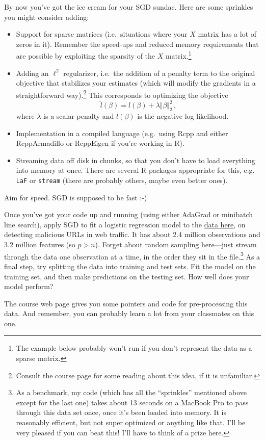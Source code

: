 \documentclass{mynotes}
\begin{document}
By now you've got the ice cream for your SGD sundae.  Here are some sprinkles you might consider adding:
\begin{itemize}
\item Support for sparse matrices (i.e.~situations where your $X$ matrix has a lot of zeros in it).  Remember the speed-ups and reduced memory requirements that are possible by exploiting the sparsity of the $X$ matrix.\footnote{The example below probably won't run if you don't represent the data as a sparse matrix. }
\item Adding an $\ell^2$ regularizer, i.e.~the addition of a penalty term to the original objective that stabilizes your estimates (which will modify the gradients in a straightforward way).\footnote{Consult the course page for some reading about this idea, if it is unfamiliar.}  This corresponds to optimizing the objective
$$
\tilde{l}(\beta) = l(\beta) + \lambda \Vert \beta \Vert_2^2 \, ,
$$
where $\lambda$ is a scalar penalty and $l(\beta)$ is the negative log likelihood.
\item Implementation in a compiled language (e.g.~using Rcpp and either RcppArmadillo or RcppEigen if you're working in R).
\item Streaming data off disk in chunks, so that you don't have to load everything into memory at once.  There are several R packages appropriate for this, e.g. \verb|LaF| or \verb|stream| (there are probably others, maybe even better ones).
\end{itemize}

Aim for speed.  SGD is supposed to be fast :-)

Once you've got your code up and running (using either AdaGrad or minibatch line search), apply SGD to fit a logistic regression model to the \href{http://archive.ics.uci.edu/ml/datasets/URL+Reputation}{data here}, on detecting malicious URLs in web traffic.  It has about 2.4 million observations and 3.2 million features (so $p > n$).   Forget about random sampling here---just stream through the data one observation at a time, in the order they sit in the file.\footnote{As a benchmark, my code (which has all the ``sprinkles'' mentioned above except for the last one) takes about 13 seconds on a MacBook Pro to pass through this data set once, once it's been loaded into memory.  It is reasonably efficient, but not super optimized or anything like that.   I'll be very pleased if you can beat this!  I'll have to think of a prize here.}  As a final step, try splitting the data into training and test sets.  Fit the model on the training set, and then make predictions on the testing set.  How well does your model perform?

The course web page gives you some pointers and code for pre-processing this data.  And remember, you can probably learn a lot from your classmates on this one.
\end{document}
